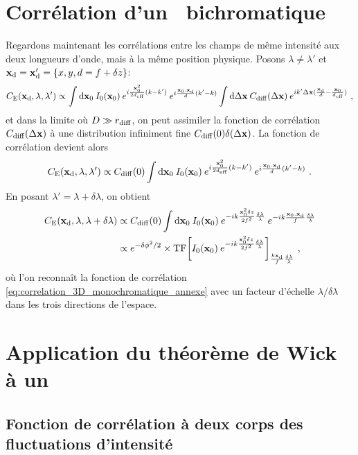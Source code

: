 \section{Corrélation d'un \speckle\ bichromatique}
Regardons maintenant les corrélations entre les champs de même intensité aux deux longueurs d'onde, mais à la même position physique. Posons $\lambda\neq\lambda'$ et $\mathbf{x}_{\mathrm{d}}=\mathbf{x}_{\mathrm{d}}'=\lbrace x,y,d=f+\delta z \rbrace$:
\begin{equation}
C_{\mathrm{E}}(\mathbf{x}_{\mathrm{d}},\lambda,\lambda') \propto \int{\mathop{}\mathopen{}\mathrm{d}\mathbf{x}_0\: I_0(\mathbf{x}_0) \: e^{i\frac{\mathbf{x}_0^2}{2d_{\mathrm{eff}}}(k-k')} \: e^{i\frac{\mathbf{x}_0.\mathbf{x}_{\mathrm{d}}}{d}(k'-k)} \int{\mathop{}\mathopen{}\mathrm{d}\Delta\mathbf{x}\: C_{\mathrm{diff}}(\Delta\mathbf{x}) \: e^{i k' \Delta\mathbf{x}(\frac{\mathbf{x}_{\mathrm{d}}}{d}-\frac{\mathbf{x}_0}{d_{\mathrm{eff}}})}}} \text{ ,}
\end{equation}
et dans la limite où $D\gg r_{\mathrm{diff}}$, on peut assimiler la fonction de corrélation $C_{\mathrm{diff}}(\Delta\mathbf{x})$  à une distribution infiniment fine $C_{\mathrm{diff}}(0) \delta(\Delta\mathbf{x})$. La fonction de corrélation devient alors
\begin{equation}
C_{\mathrm{E}}(\mathbf{x}_{\mathrm{d}},\lambda,\lambda') \propto  C_{\mathrm{diff}}(0) \int{\mathop{}\mathopen{}\mathrm{d}\mathbf{x}_0\: I_0(\mathbf{x}_0) \: e^{i\frac{\mathbf{x}_0^2}{2d_{\mathrm{eff}}}(k-k')} \: e^{i\frac{\mathbf{x}_0.\mathbf{x}_{\mathrm{d}}}{d}(k'-k)}} \text{ .}
\end{equation}
En posant $\lambda'=\lambda+ \delta \lambda$, on obtient
\begin{align}
C_{\mathrm{E}}(\mathbf{x}_{\mathrm{d}},\lambda, \lambda+\delta\lambda) &\propto C_{\mathrm{diff}}(0) \int{\mathop{}\mathopen{}\mathrm{d}\mathbf{x}_0\: I_0(\mathbf{x}_0) \: e^{-ik \frac{\mathbf{x}_0^2 \delta z}{2f^2} \frac{\delta \lambda}{\lambda}} \: e^{-ik \frac{\mathbf{x}_0.\mathbf{x}_{\mathrm{d}}}{f}\frac{\delta \lambda}{\lambda}}} \\
& \propto e^{-\delta\phi^2/2} \times \mathrm{TF}{\left[ I_0(\mathbf{x}_0)\: e^{-ik\frac{\mathbf{x}_0^2 \delta z}{2f^2} \frac{\delta\lambda}{\lambda}} \right]}_{\frac{k \mathbf{x}_{\mathrm{d}}}{f}\frac{\delta \lambda}{\lambda}} \text{ ,}
\end{align}
où l'on reconnaît la fonction de corrélation \ref{eq:correlation_3D_monochromatique_annexe} avec un facteur d'échelle $\lambda/\delta\lambda$ dans les trois directions de l'espace.












\section{Application du théorème de Wick à un \speckle }
\subsection{Fonction de corrélation à deux corps des fluctuations d'intensité}

